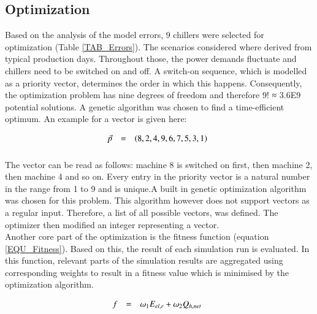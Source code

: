\documentclass[3p,times,procedia,twocolumn,twoside]{elsarticle}
\begin{document}
\subsection{Optimization}
Based on the analysis of the model errors, 9 chillers were selected for optimization (Table \ref{TAB_Errors}). The scenarios considered where derived from typical production days. Throughout those, the power demands fluctuate and chillers need to be switched on and off. A switch-on sequence, which is modelled as a priority vector, determines the order in which this happens. Consequently, the optimization problem has nine degrees of freedom and therefore 9! ≈ 3.6E9 potential solutions. A genetic algorithm was chosen to find a time-efficient optimum.
An example for a vector is given here:

\begin{equation}
\begin{array}{@{}lcl}

\displaystyle 
\vec{p} &=& 
\displaystyle 
\left(8,2,4,9,6,7,5,3,1\right)
\\[6pt]

\end{array}\vspace*{-12pt}
\end{equation}

The vector can be read as follows: machine 8 is switched on first, then machine 2, then machine 4 and so on. Every entry in the priority vector is a natural number in the range from 1 to 9 and is unique.A built in genetic optimization algorithm was chosen for this problem. This algorithm however does not support vectors as a regular input. Therefore, a list of all possible vectors, was defined. The optimizer then modified an integer representing a vector.\\
Another core part of the optimization is the fitness function (equation \ref{EQU_Fitness}). Based on this, the result of each simulation run is evaluated. In this function, relevant parts of the simulation results are aggregated using corresponding weights to result in a fitness value which is minimised by the optimization algorithm.

\begin{equation}
\begin{array}{@{}lcl}

\displaystyle 
f &=& 
\displaystyle 
\omega_{1}E_{el,r} + \omega_{2}Q_{h,net}
\\[6pt]

\end{array}\vspace*{-12pt}
\label{EQU_Fitness}
\end{equation}
\end{document}
